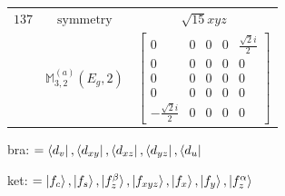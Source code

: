 \documentclass[fleqn,8pt,landscape]{jsarticle}
\begin{document}
\begin{longtable}{ccc}
$ 137 $ & $ \text{symmetry} $ & $ \sqrt{15} x y z $ \\
$  $ & $ \mathbb{M}_{3,2}^{(a)}(E_{g},2) $ & $ \begin{bmatrix} 0 & 0 & 0 & 0 & \frac{\sqrt{2} i}{2} \\ 0 & 0 & 0 & 0 & 0 \\ 0 & 0 & 0 & 0 & 0 \\ 0 & 0 & 0 & 0 & 0 \\ - \frac{\sqrt{2} i}{2} & 0 & 0 & 0 & 0 \end{bmatrix} $ \\ \hline
\end{longtable}
bra: $=\bra{d_{v}}, \bra{d_{xy}}, \bra{d_{xz}}, \bra{d_{yz}}, \bra{d_{u}}$

\noindent
ket: $=\ket{f_{c}}, \ket{f_{s}}, \ket{f_{z}^{\beta}}, \ket{f_{xyz}}, \ket{f_{x}}, \ket{f_{y}}, \ket{f_{z}^{\alpha}}$
\renewcommand{\arraystretch}{1.6}
\end{document}
